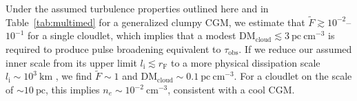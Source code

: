 \documentclass[twocolumn, linenumbers, tra]{aastex631}
\newcommand{\rev}[1]{{\color{purple}#1}}
\begin{document}
{%
Under the assumed turbulence properties outlined here and in Table~\ref{tab:multimed} for a generalized clumpy CGM, we estimate that $\widetilde{F} \gtrsim 10^{-2}$--$10^{-1}$ for a single cloudlet, which implies that a modest $\mathrm{DM}_{\mathrm{cloud}} \lesssim 3\ \mathrm{pc\ cm}^{-3}$ is required to produce pulse broadening equivalent to $\tau_{\mathrm{obs}}$.} If we reduce our assumed inner scale from its upper limit $l_\mathrm{i} \lesssim r_\mathrm{F}$ to a more physical dissipation scale $l_\mathrm{i} \sim 10^3\ \mathrm{km}$ \citep[e.g., the ion inertial scale or gyroradius in a cool CGM;][]{Ocker2025}, we find $\widetilde{F} \sim 1$ and $\mathrm{DM}_{\mathrm{cloud}} \sim 0.1\ \mathrm{pc\ cm}^{-3}$. For a cloudlet on the scale of $ \sim 10\ \mathrm{pc}$, this implies $n_e \sim 10^{-2}\ \mathrm{cm}^{-3}$, consistent with a cool CGM.  

\end{document}
